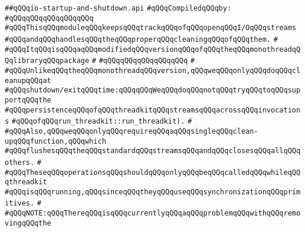 \label{src/lib/std/src/io/io-startup-and-shutdown.api}
\verb|##qQQqio-startup-and-shutdown.api|\newline
\newline
\verb|#qQQqCompiledqQQqby:|\newline
\verb|#qQQqqQQqqQQqqQQqqQQq|\newline
\newline
\newline
\newline
\verb|#qQQqThisqQQqmoduleqQQqkeepsqQQqtrackqQQqofqQQqopenqQQqI/OqQQqstreams|\newline
\verb|#qQQqandqQQqhandlesqQQqtheqQQqproperqQQqcleaningqQQqofqQQqthem.|\newline
\verb|#|\newline
\verb|#qQQqItqQQqisqQQqaqQQqmodifiedqQQqversionqQQqofqQQqtheqQQqmonothreadqQQqlibraryqQQqpackage|\newline
\verb|#|\newline
\verb|#qQQqqQQqqQQqqQQqqQQq|\newline
\verb|#|\newline
\verb|#qQQqUnlikeqQQqtheqQQqmonothreadqQQqversion,qQQqweqQQqonlyqQQqdoqQQqcleanupqQQqat|\newline
\verb|#qQQqshutdown/exitqQQqtime:qQQqqQQqWeqQQqdoqQQqnotqQQqtryqQQqtoqQQqsupportqQQqthe|\newline
\verb|#qQQqpersistenceqQQqofqQQqthreadkitqQQqstreamsqQQqacrossqQQqinvocations|\newline
\verb|#qQQqofqQQqrun_threadkit::run_threadkit).|\newline
\verb|#|\newline
\verb|#qQQqAlso,qQQqweqQQqonlyqQQqrequireqQQqaqQQqsingleqQQqclean-upqQQqfunction,qQQqwhich|\newline
\verb|#qQQqflushesqQQqtheqQQqstandardqQQqstreamsqQQqandqQQqclosesqQQqallqQQqothers.|\newline
\verb|#|\newline
\verb|#qQQqTheseqQQqoperationsqQQqshouldqQQqonlyqQQqbeqQQqcalledqQQqwhileqQQqthreadkit|\newline
\verb|#qQQqisqQQqrunning,qQQqsinceqQQqtheyqQQquseqQQqsynchronizationqQQqprimitives.|\newline
\verb|#|\newline
\verb|#qQQqNOTE:qQQqThereqQQqisqQQqcurrentlyqQQqaqQQqproblemqQQqwithqQQqremovingqQQqthe|\newline
